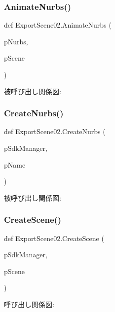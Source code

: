 \subsubsection{\texorpdfstring{Animate\+Nurbs()}{AnimateNurbs()}}
{\footnotesize\ttfamily def Export\+Scene02.\+Animate\+Nurbs (\begin{DoxyParamCaption}\item[{}]{p\+Nurbs,  }\item[{}]{p\+Scene }\end{DoxyParamCaption})}

被呼び出し関係図\+:
\mbox{\label{namespace_export_scene02_a1bc6888735786ae7f0f9f3cb9066e31d}} 
\subsubsection{\texorpdfstring{Create\+Nurbs()}{CreateNurbs()}}
{\footnotesize\ttfamily def Export\+Scene02.\+Create\+Nurbs (\begin{DoxyParamCaption}\item[{}]{p\+Sdk\+Manager,  }\item[{}]{p\+Name }\end{DoxyParamCaption})}

被呼び出し関係図\+:
\mbox{\label{namespace_export_scene02_ab05e0f19c09bbd1997ef575f237d317e}} 
\subsubsection{\texorpdfstring{Create\+Scene()}{CreateScene()}}
{\footnotesize\ttfamily def Export\+Scene02.\+Create\+Scene (\begin{DoxyParamCaption}\item[{}]{p\+Sdk\+Manager,  }\item[{}]{p\+Scene }\end{DoxyParamCaption})}

呼び出し関係図\+:
\mbox{\label{namespace_export_scene02_adc6a1f38f469ce06003f6969995c6fd4}} 
